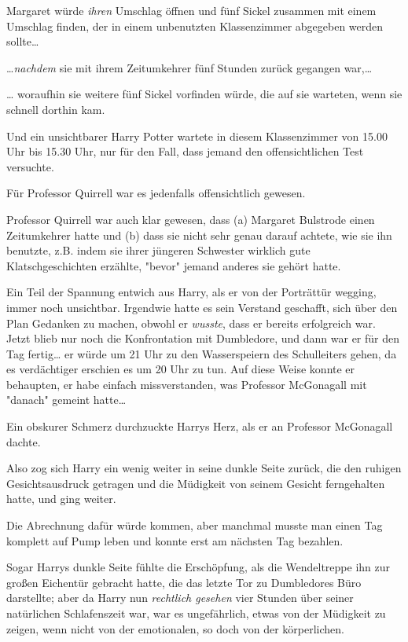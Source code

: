 {Margaret würde \emph{ihren} Umschlag öffnen und fünf Sickel zusammen mit einem Umschlag finden, der in einem unbenutzten Klassenzimmer abgegeben werden sollte…

…\emph{nachdem} sie mit ihrem Zeitumkehrer fünf Stunden zurück gegangen war,…

… woraufhin sie weitere fünf Sickel vorfinden würde, die auf sie warteten, wenn sie schnell dorthin kam.

Und ein unsichtbarer Harry Potter wartete in diesem Klassenzimmer von 15.00 Uhr bis 15.30 Uhr, nur für den Fall, dass jemand den offensichtlichen Test versuchte.

Für Professor Quirrell war es jedenfalls offensichtlich gewesen.

Professor Quirrell war auch klar gewesen, dass (a) Margaret Bulstrode einen Zeitumkehrer hatte und (b) dass sie nicht sehr genau darauf achtete, wie sie ihn benutzte, z.B. indem sie ihrer jüngeren Schwester wirklich gute Klatschgeschichten erzählte, "bevor" jemand anderes sie gehört hatte.

Ein Teil der Spannung entwich aus Harry, als er von der Porträttür wegging, immer noch unsichtbar. Irgendwie hatte es sein Verstand geschafft, sich über den Plan Gedanken zu machen, obwohl er \emph{wusste}, dass er bereits erfolgreich war. Jetzt blieb nur noch die Konfrontation mit Dumbledore, und dann war er für den Tag fertig… er würde um 21 Uhr zu den Wasserspeiern des Schulleiters gehen, da es verdächtiger erschien es um 20 Uhr zu tun. Auf diese Weise konnte er behaupten, er habe einfach missverstanden, was Professor McGonagall mit "danach" gemeint hatte…

Ein obskurer Schmerz durchzuckte Harrys Herz, als er an Professor McGonagall dachte.

Also zog sich Harry ein wenig weiter in seine dunkle Seite zurück, die den ruhigen Gesichtsausdruck getragen und die Müdigkeit von seinem Gesicht ferngehalten hatte, und ging weiter.

Die Abrechnung dafür würde kommen, aber manchmal musste man einen Tag komplett auf Pump leben und konnte erst am nächsten Tag bezahlen.

Sogar Harrys dunkle Seite fühlte die Erschöpfung, als die Wendeltreppe ihn zur großen Eichentür gebracht hatte, die das letzte Tor zu Dumbledores Büro darstellte; aber da Harry nun \emph{rechtlich gesehen} vier Stunden über seiner natürlichen Schlafenszeit war, war es ungefährlich, etwas von der Müdigkeit zu zeigen, wenn nicht von der emotionalen, so doch von der körperlichen.

}
